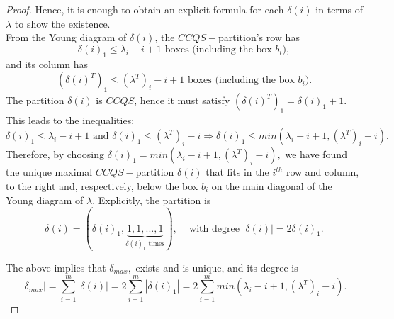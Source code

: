 \documentclass[main.tex]{subfiles}
\begin{document}
\begin{proof}
    Hence, it is enough to obtain an explicit formula for each $\delta(i)$ in terms of $\lambda$ to show the existence.\\
    
    From the Young diagram of $\delta(i)$, the $CCQS-$partition's row has $$\delta(i)_1 \leq \lambda_i-i+1 \text{ boxes (including the box $b_i$)},$$ and its column has $$(\delta(i)^T)_1 \leq (\lambda^T)_i-i+1 \text{ boxes (including the box $b_i$).}$$ The partition $\delta(i)$ is $CCQS$, hence it must satisfy $(\delta(i)^T)_1 = \delta(i)_1+1$. This leads to the inequalities:
    $$\delta(i)_1 \leq \lambda_i-i+1 \text{ and } \delta(i)_1 \leq (\lambda^T)_i-i \Rightarrow 
    \delta(i)_1 \leq min( \lambda_i-i+1, (\lambda^T)_i-i).$$
    Therefore, by choosing $\delta(i)_1 = min( \lambda_i-i+1, (\lambda^T)_i-i),$ we have found the unique maximal $CCQS-$partition $\delta(i)$ that fits in the $i^{th}$ row and column, to the right and, respectively, below the box $b_i$ on the main diagonal of the Young diagram of $\lambda$. Explicitly, the partition is 
    $$\delta(i)= (\delta(i)_1, \underbrace{1, 1, ..., 1}_\text{$\delta(i)_1$ times}), \;\;\;\text{ with degree } |\delta(i)|= 2\delta(i)_1.$$

   The above implies that $\delta_{max},$ exists and is unique, and its degree is 
    $$
    |\delta_{max}| = \sum\limits_{i=1}^{m}|\delta(i)| = 2\sum\limits_{i=1}^{m}|\delta(i)_1|=2\sum\limits_{i=1}^{m} min(\lambda_i-i+1, (\lambda^T)_i-i).
    $$

\end{proof}

\bigskip
\end{document}
